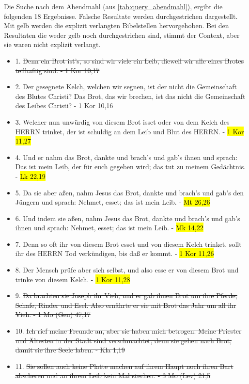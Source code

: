 Die Suche nach dem Abendmahl (aus \cref{tab:query_abendmahl}), ergibt die folgenden 18 Ergebnisse.
Falsche Resultate werden durchgestrichen dargestellt. Mit gelb werden die explizit verlangten Bibelstellen hervorgehoben.
Bei den Resultaten die weder gelb noch durchgestrichen sind, stimmt der Context, aber sie waren nicht explizit verlangt.\\
\begin{itemize}[noitemsep]
	\item 1.	\st{Denn ein Brot ist's, so sind wir viele ein Leib, dieweil wir alle eines Brotes teilhaftig sind. - 1 Kor 10,17}
	\item 2.	Der gesegnete Kelch, welchen wir segnen, ist der nicht die Gemeinschaft des Blutes Christi? Das Brot, das wir brechen, ist das nicht die Gemeinschaft des Leibes Christi? - 1 Kor 10,16
	\item 3.	Welcher nun unwürdig von diesem Brot isset oder von dem Kelch des HERRN trinket, der ist schuldig an dem Leib und Blut des HERRN. - \hl{1 Kor 11,27}
	\item 4.	Und er nahm das Brot, dankte und brach's und gab's ihnen und sprach: Das ist mein Leib, der für euch gegeben wird; das tut zu meinem Gedächtnis. - \hl{Lk 22,19}
	\item 5.	Da sie aber aßen, nahm Jesus das Brot, dankte und brach's und gab's den Jüngern und sprach: Nehmet, esset; das ist mein Leib. - \hl{Mt 26,26}
	\item 6.	Und indem sie aßen, nahm Jesus das Brot, dankte und brach's und gab's ihnen und sprach: Nehmet, esset; das ist mein Leib. - \hl{Mk 14,22}
	\item 7.	Denn so oft ihr von diesem Brot esset und von diesem Kelch trinket, sollt ihr des HERRN Tod verkündigen, bis daß er kommt. - \hl{1 Kor 11,26}
	\item 8.	Der Mensch prüfe aber sich selbst, und also esse er von diesem Brot und trinke von diesem Kelch. - \hl{1 Kor 11,28}
	\item 9.	\st{Da brachten sie Joseph ihr Vieh; und er gab ihnen Brot um ihre Pferde, Schafe, Rinder und Esel. Also ernährte er sie mit Brot das Jahr um all ihr Vieh. - 1 Mo (Gen) 47,17}
	\item 10.	\st{Ich rief meine Freunde an, aber sie haben mich betrogen. Meine Priester und Ältesten in der Stadt sind verschmachtet; denn sie gehen nach Brot, damit sie ihre Seele laben. - Kla 1,19}
	\item 11.	\st{Sie sollen auch keine Platte machen auf ihrem Haupt noch ihren Bart abscheren und an ihrem Leib kein Mal stechen. - 3 Mo (Lev) 21,5}

\end{itemize}
